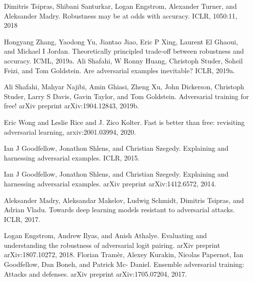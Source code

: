 \documentclass{article}
\begin{document}
\begin{thebibliography}{100} 
	 {Dimitris Tsipras, Shibani Santurkar, Logan Engstrom, Alexander Turner, and Aleksander Madry. Robustness may be at odds with accuracy. ICLR, 1050:11, 2018}

	 {Hongyang Zhang, Yaodong Yu, Jiantao Jiao, Eric P Xing, Laurent El Ghaoui, and Michael I Jordan. Theoretically principled trade-off between robustness and accuracy. ICML, 2019a.}
	 {Ali Shafahi, W Ronny Huang, Christoph Studer, Soheil Feizi, and Tom Goldstein. Are adversarial examples inevitable? ICLR, 2019a.}
	
	 {Ali Shafahi, Mahyar Najibi, Amin Ghiasi, Zheng Xu,
		John Dickerson, Christoph Studer, Larry S Davis, Gavin Taylor, and Tom
		Goldstein. Adversarial training for free! arXiv preprint arXiv:1904.12843,
		2019b.}
	
	 {Eric Wong and Leslie Rice and J. Zico Kolter. Fast is better than free: revisiting adversarial learning, arxiv:2001.03994, 2020.}
	
	 {Ian J Goodfellow, Jonathon Shlens, and Christian Szegedy. Explaining and harnessing adversarial examples. ICLR, 2015.}
	
	 {Ian J Goodfellow, Jonathon Shlens, and Christian Szegedy. Explaining and harnessing adversarial examples. arXiv preprint arXiv:1412.6572, 2014.}
	
	 {Aleksander Madry, Aleksandar Makelov, Ludwig Schmidt, Dimitris Tsipras, and Adrian Vladu. Towards deep learning models resistant to adversarial attacks. ICLR, 2017.}
	
	 {Logan Engstrom, Andrew Ilyas, and Anish Athalye. Evaluating and understanding the robustness of adversarial logit pairing. arXiv preprint arXiv:1807.10272, 2018.}
		 {Florian Tramèr, Alexey Kurakin, Nicolas Papernot,
		Ian Goodfellow, Dan Boneh, and Patrick Mc- Daniel. Ensemble adversarial
		training: Attacks and defenses. arXiv preprint arXiv:1705.07204, 2017.}
	
\end{thebibliography}
	
\end{document}
